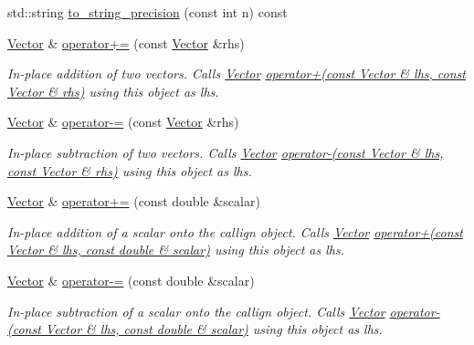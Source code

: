 \begin{DoxyCompactItemize}
std\+::string \hyperlink{classJSL_1_1Vector_a91d4cf29c2865069520d03292844d84f}{to\+\_\+string\+\_\+precision} (const int n) const
\item 
\hyperlink{classJSL_1_1Vector}{Vector} \& \hyperlink{classJSL_1_1Vector_ad46bf395dd6122ce152c33aad2672a9b}{operator+=} (const \hyperlink{classJSL_1_1Vector}{Vector} \&rhs)
\begin{DoxyCompactList}\small\item\em In-\/place addition of two vectors. Calls \hyperlink{classJSL_1_1Vector}{Vector} \hyperlink{namespaceJSL_ae6530b77174d0dfae8e0d6e2a810f672}{operator+(const Vector \& lhs, const Vector \& rhs)} using this object as lhs. \end{DoxyCompactList}\item 
\hyperlink{classJSL_1_1Vector}{Vector} \& \hyperlink{classJSL_1_1Vector_a71720a9266944049cd3adfbe50e1703f}{operator-\/=} (const \hyperlink{classJSL_1_1Vector}{Vector} \&rhs)
\begin{DoxyCompactList}\small\item\em In-\/place subtraction of two vectors. Calls \hyperlink{classJSL_1_1Vector}{Vector} \hyperlink{namespaceJSL_a1d8393f2865dc23e7975ad041e341ba5}{operator-\/(const Vector \& lhs, const Vector \& rhs)} using this object as lhs. \end{DoxyCompactList}\item 
\hyperlink{classJSL_1_1Vector}{Vector} \& \hyperlink{classJSL_1_1Vector_aeca45a175db04725394a1b576507e708}{operator+=} (const double \&scalar)
\begin{DoxyCompactList}\small\item\em In-\/place addition of a scalar onto the callign object. Calls \hyperlink{classJSL_1_1Vector}{Vector} \hyperlink{namespaceJSL_a4b293e2ac3df51113e80022cb3c2ac99}{operator+(const Vector \& lhs, const double \& scalar)} using this object as lhs. \end{DoxyCompactList}\item 
\hyperlink{classJSL_1_1Vector}{Vector} \& \hyperlink{classJSL_1_1Vector_a8a395851b8dffbe5b0aea7e051f9aac8}{operator-\/=} (const double \&scalar)
\begin{DoxyCompactList}\small\item\em In-\/place subtraction of a scalar onto the callign object. Calls \hyperlink{classJSL_1_1Vector}{Vector} \hyperlink{namespaceJSL_ac6bd9311dd73aa6227d826bdb94e748d}{operator-\/(const Vector \& lhs, const double \& scalar)} using this object as lhs. \end{DoxyCompactList}\item 

\end{DoxyCompactItemize}

